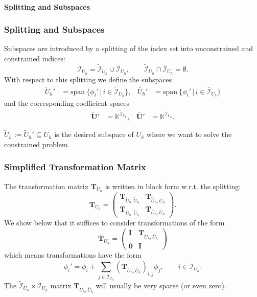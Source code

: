 \paragraph{Splitting and Subspaces} 

\begin{frame}
\frametitle<presentation>{Splitting and Subspaces}
Subspaces are introduced by a splitting of
the index set into unconstrained and constrained indices:
\begin{equation*}
\mathcal{I}_{U_h} = \tilde{\mathcal{I}}_{U_h} \cup
\bar{\mathcal{I}}_{U_h}, \qquad  \tilde{\mathcal{I}}_{U_h} \cap
\bar{\mathcal{I}}_{U_h} = \emptyset.
\end{equation*}
With respect to this splitting we define the subspaces
\begin{align*}
\tilde{U}_h' &= \text{span}\ \{\phi_i'\,|\,
i\in\tilde{\mathcal{I}}_{U_h}\}, &
\bar{U}_h' &= \text{span}\ \{\phi_i'\,|\,
i\in\bar{\mathcal{I}}_{U_h}\}
\end{align*}
and the corresponding coefficient spaces
\begin{align*}
\tilde{\mathbf{U}}' &=
\mathbb{K}^{\tilde{\mathcal{I}}_{U_h}}, &
\bar{\mathbf{U}}' &=
\mathbb{K}^{\bar{\mathcal{I}}_{U_h}}.
\end{align*}

$\tilde{U}_h := \tilde{U}_h'\subseteq U_h$ is the desired subspace of
$U_h$ where we want to solve the constrained problem.
\end{frame}


\begin{frame}
\frametitle<presentation>{Simplified Transformation Matrix}
The transformation matrix $\mathbf{T}_{U_h}$ is written in block
form w.r.t. the splitting:
\begin{equation*}
\mathbf{T}_{U_h} = \left(\begin{array}{cc}
\mathbf{T}_{\tilde{U}_h,\tilde{U}_h} & \mathbf{T}_{\tilde{U}_h,\bar{U}_h}\\
\mathbf{T}_{\bar{U}_h,\tilde{U}_h} & \mathbf{T}_{\bar{U}_h,\bar{U}_h}
\end{array}\right) .
\end{equation*}
We show below that it suffices to consider transformations of the form
\begin{equation}\label{Eq:StructureTransformation}
\mathbf{T}_{U_h} = \left(\begin{array}{cc}
\mathbf{I} & \mathbf{T}_{\tilde{U}_h,\bar{U}_h}\\
\mathbf{0} & \mathbf{I}
\end{array}\right)
\end{equation}
which means transformations have the form
\begin{equation*}
\phi_i' = \phi_i + \sum_{j\in\bar{\mathcal{I}}_{U_h}}
\left(\mathbf{T}_{\tilde{U}_h,\bar{U}_h}\right)_{i,j} \phi_j, \qquad i\in \tilde{\mathcal{I}}_{U_h}.
\end{equation*}
The $\tilde{\mathcal{I}}_{U_h} \times \bar{\mathcal{I}}_{U_h}$  matrix
$\mathbf{T}_{\tilde{U}_h,\bar{U}_h}$ will usually be very sparse (or
even zero).
\end{frame}

